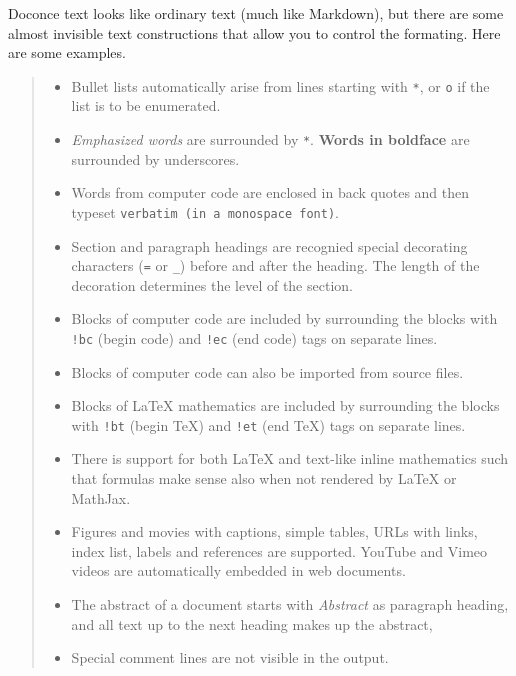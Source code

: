 \documentclass[a4paper]{article}
\begin{document}
Doconce text looks like ordinary text (much like Markdown), but there
are some almost invisible text constructions that allow you to control
the formating. Here are some examples.
%
\begin{quote}
%
\begin{itemize}

\item Bullet lists automatically arise from lines starting with \texttt{*},
or \texttt{o} if the list is to be enumerated.

\item \emph{Emphasized words} are surrounded by \texttt{*}. \textbf{Words in boldface}
are surrounded by underscores.

\item Words from computer code are enclosed in back quotes and
then typeset \texttt{verbatim (in a monospace font)}.

\item Section and paragraph headings are recognied special
decorating characters (\texttt{=} or \texttt{\_}) before and after the heading.
The length of the decoration determines the level of the
section.

\item Blocks of computer code are included by surrounding the blocks with
\texttt{!bc} (begin code) and \texttt{!ec} (end code) tags on separate lines.

\item Blocks of computer code can also be imported from source files.

\item Blocks of LaTeX mathematics are included by surrounding the blocks
with \texttt{!bt} (begin TeX) and \texttt{!et} (end TeX) tags on separate lines.

\item There is support for both LaTeX and text-like inline mathematics
such that formulas make sense also when not rendered by LaTeX
or MathJax.

\item Figures and movies with captions, simple tables,
URLs with links, index list, labels and references are supported.
YouTube and Vimeo videos are automatically embedded in web documents.

\item The abstract of a document starts with \emph{Abstract} as paragraph
heading, and all text up to the next heading makes up the abstract,

\item Special comment lines are not visible in the output.


\end{itemize}
\end{quote}
\end{document}
